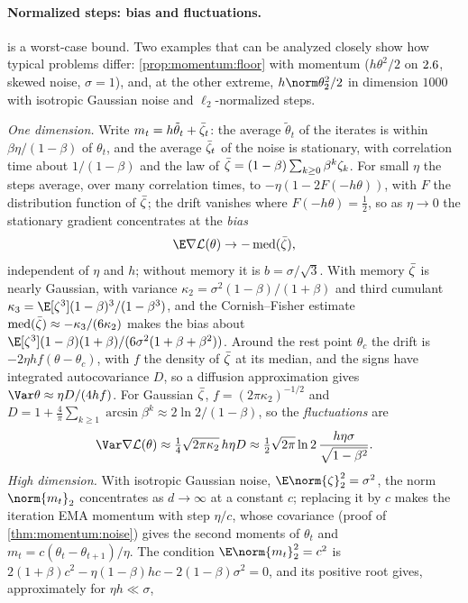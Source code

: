 \begin{refsection}
\paragraph{Normalized steps: bias and fluctuations.}  is a worst-case bound. Two examples that can be analyzed closely show how typical problems differ: \cref{prop:momentum:floor} with momentum ($h\theta^2/2$ on $2.6$, skewed noise, $\sigma=1$), and, at the other extreme, $h\norm\theta_2^2/2$ in dimension $1000$ with isotropic Gaussian noise and $\ell_2$-normalized steps.

\begin{heuristic}
\emph{One dimension.} Write $m_t=h\tilde\theta_t+\bar\zeta_t$: the average $\tilde\theta_t$ of the iterates is within $\beta\eta/(1-\beta)$ of $\theta_t$, and the average $\bar\zeta_t$ of the noise is stationary, with correlation time about $1/(1-\beta)$ and the law of $\bar\zeta=(1-\beta)\sum_{k\ge0}\beta^k\zeta_k$. For small $\eta$ the steps average, over many correlation times, to $-\eta(1-2F(-h\theta))$, with $F$ the distribution function of $\bar\zeta$; the drift vanishes where $F(-h\theta)=\frac12$, so as $\eta\to0$ the stationary gradient concentrates at the \emph{bias}
\begin{equation}\label{eq:momentum:bias}
  \E\nabla\Loss(\theta)\to-\momentummed(\momentumzbar),
\end{equation}
independent of $\eta$ and $h$; without memory it is $b=\sigma/\sqrt3$. With memory $\bar\zeta$ is nearly Gaussian, with variance $\kappa_2=\sigma^2(1-\beta)/(1+\beta)$ and third cumulant $\kappa_3=\E[\zeta^3](1-\beta)^3/(1-\beta^3)$, and the Cornish--Fisher estimate $\operatorname{med}(\bar\zeta)\approx-\kappa_3/(6\kappa_2)$ makes the bias about $\E[\zeta^3](1-\beta)(1+\beta)/(6\sigma^2(1+\beta+\beta^2))$. Around the rest point $\theta_c$ the drift is $-2\eta hf(\theta-\theta_c)$, with $f$ the density of $\bar\zeta$ at its median, and the signs have integrated autocovariance $D$, so a diffusion approximation gives $\Var\theta\approx\eta D/(4hf)$. For Gaussian $\bar\zeta$, $f=(2\pi\kappa_2)^{-1/2}$ and $D=1+\frac4\pi\sum_{k\ge1}\arcsin\beta^k\approx2\ln2/(1-\beta)$, so the \emph{fluctuations} are
\begin{equation}\label{eq:momentum:fluct}
  \Var\nabla\Loss(\theta)\approx\tfrac14\sqrt{2\pi\kappa_2}\,h\eta D\approx\tfrac12\sqrt{2\pi}\ln2\,\frac{h\eta\sigma}{\sqrt{1-\beta^2}}.
\end{equation}
\emph{High dimension.} With isotropic Gaussian noise, $\E\norm{\zeta}_2^2=\sigma^2$, the norm $\norm{m_t}_2$ concentrates as $d\to\infty$ at a constant $c$; replacing it by $c$ makes the iteration EMA momentum with step $\eta/c$, whose covariance (proof of \cref{thm:momentum:noise}) gives the second moments of $\theta_t$ and $m_t=c(\theta_t-\theta_{t+1})/\eta$. The condition $\E\norm{m_t}_2^2=c^2$ is $2(1+\beta)c^2-\eta(1-\beta)hc-2(1-\beta)\sigma^2=0$, and its positive root gives, approximately for $\eta h\ll\sigma$,

\end{heuristic}
\end{refsection}
